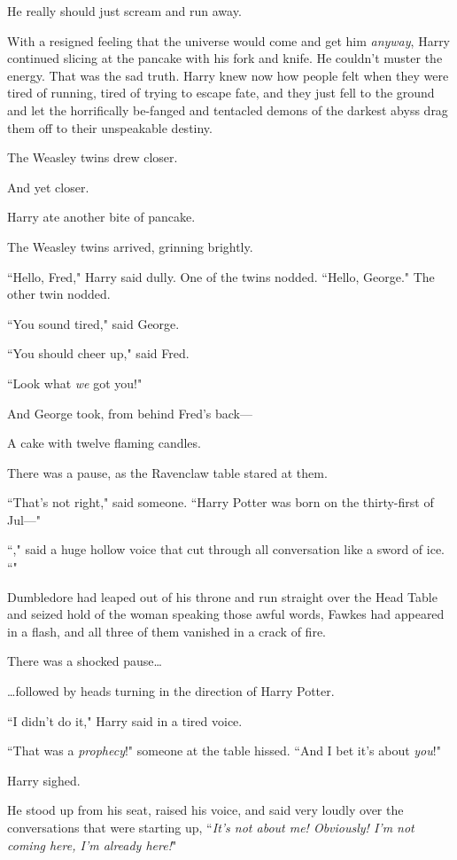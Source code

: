 He really should just scream and run away.

With a resigned feeling that the universe would come and get him \emph{anyway}, Harry continued slicing at the pancake with his fork and knife. He couldn't muster the energy. That was the sad truth. Harry knew now how people felt when they were tired of running, tired of trying to escape fate, and they just fell to the ground and let the horrifically be-fanged and tentacled demons of the darkest abyss drag them off to their unspeakable destiny.

The Weasley twins drew closer.

And yet closer.

Harry ate another bite of pancake.

The Weasley twins arrived, grinning brightly.

``Hello, Fred," Harry said dully. One of the twins nodded. ``Hello, George." The other twin nodded.

``You sound tired," said George.

``You should cheer up," said Fred.

``Look what \emph{we} got you!"

And George took, from behind Fred's back—

A cake with twelve flaming candles.

There was a pause, as the Ravenclaw table stared at them.

``That's not right," said someone. ``Harry Potter was born on the thirty-first of Jul—"

``," said a huge hollow voice that cut through all conversation like a sword of ice. ``"

Dumbledore had leaped out of his throne and run straight over the Head Table and seized hold of the woman speaking those awful words, Fawkes had appeared in a flash, and all three of them vanished in a crack of fire.

There was a shocked pause{\ldots}

{\ldots}followed by heads turning in the direction of Harry Potter.

``I didn't do it," Harry said in a tired voice.

``That was a \emph{prophecy}!" someone at the table hissed. ``And I bet it's about \emph{you}!"

Harry sighed.

He stood up from his seat, raised his voice, and said very loudly over the conversations that were starting up, ``\emph{It's not about me! Obviously! I'm not coming here, I'm already here!}"

